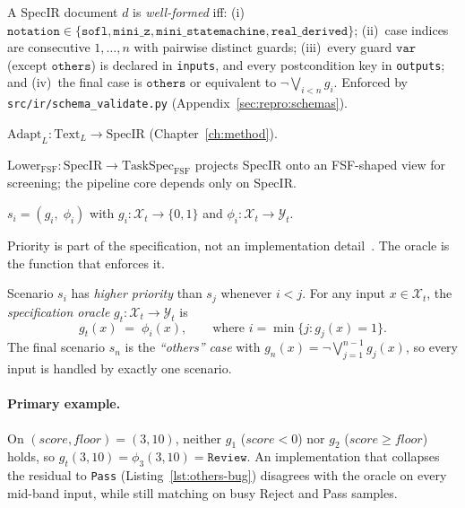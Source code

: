 \begin{definition}
\label{def:specir-wf}
A SpecIR document $d$ is \emph{well-formed} iff:
(i)~$\texttt{notation}\in\{\texttt{sofl},\texttt{mini\_z},
\texttt{mini\_statemachine},\texttt{real\_derived}\}$;
(ii)~case indices are consecutive $1,\ldots,n$ with pairwise distinct guards;
(iii)~every guard $\texttt{var}$ (except $\texttt{others}$) is declared in
\texttt{inputs}, and every postcondition key in \texttt{outputs}; and
(iv)~the final case is $\texttt{others}$ or equivalent to
$\neg\bigvee_{i<n} g_i$.
Enforced by \texttt{src/ir/schema\_validate.py}
(Appendix~\ref{sec:repro:schemas}).
\end{definition}

\begin{definition}
\label{def:spec-adapter}
$\text{Adapt}_L : \text{Text}_L \longrightarrow \text{SpecIR}$
(Chapter~\ref{ch:method}).
\end{definition}

\begin{definition}
\label{def:fsf-lowering}
$\text{Lower}_{\text{FSF}} : \text{SpecIR} \longrightarrow \text{TaskSpec}_{\text{FSF}}$
projects SpecIR onto an FSF-shaped view for screening; the pipeline core
depends only on SpecIR.
\end{definition}

\begin{definition}
\label{def:scenario}
$s_i = (g_i,\;\phi_i)$ with $g_i : \mathcal{X}_t \to \{0, 1\}$ and
$\phi_i : \mathcal{X}_t \to \mathcal{Y}_t$.
\end{definition}

Priority is part of the specification, not an implementation
detail~\citep{dijkstra1975guarded}.
The oracle is the function that enforces it.

\begin{definition}
\label{def:oracle}
Scenario $s_i$ has \emph{higher priority} than $s_j$ whenever $i < j$.
For any input $x \in \mathcal{X}_t$, the \emph{specification oracle}
$g_t : \mathcal{X}_t \to \mathcal{Y}_t$ is
\[
  g_t(x) \;=\; \phi_i(x),
  \qquad \text{where } i = \min\bigl\{j : g_j(x) = 1\bigr\}.
\]
The final scenario $s_n$ is the \emph{``others'' case} with
$g_n(x) = \neg\bigvee_{j=1}^{n-1} g_j(x)$, so every input is handled by
exactly one scenario.
\end{definition}

\paragraph{Primary example.}
On $(\mathit{score},\mathit{floor})=(3,10)$, neither $g_1$
($\mathit{score}<0$) nor $g_2$ ($\mathit{score}\ge\mathit{floor}$) holds, so
$g_t(3,10)=\phi_3(3,10)=\texttt{Review}$.
An implementation that collapses the residual to \texttt{Pass}
(Listing~\ref{lst:others-bug}) disagrees with the oracle on every mid-band
input, while still matching on busy Reject and Pass samples.


